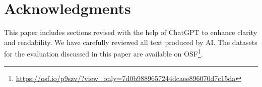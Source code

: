 \documentclass[sigconf,screen,review,anonymous]{acmart}
\begin{document}
\appendix

\section{Acknowledgments}
This paper includes sections revised with the help of ChatGPT to enhance clarity and readability.
We have carefully reviewed all text produced by AI.
The datasets for the evaluation discussed in this paper are available on OSF\footnote{\url{https://osf.io/p9szv/?view_only=7d0b9889657244dcaee896070d7c15da}}.

\balance


\end{document}
